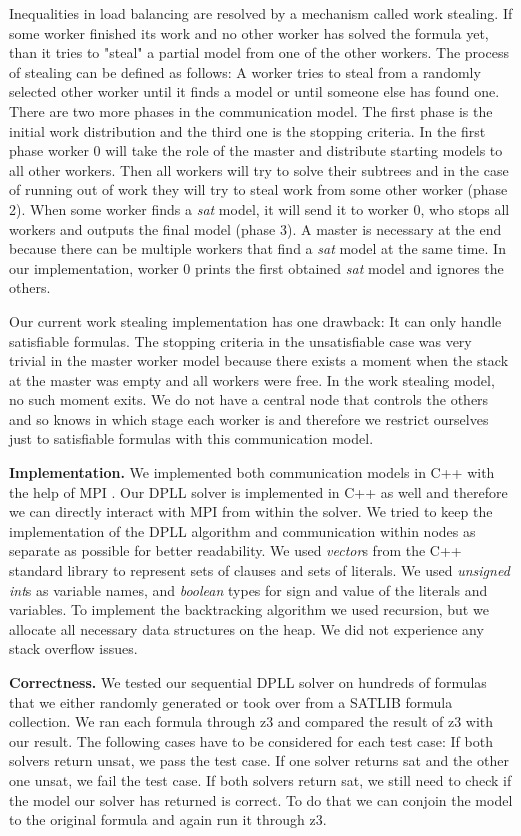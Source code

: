 \documentclass[letterpaper]{article}
\newcommand{\mypar}[1]{{\bf #1.}}
\begin{document}
Inequalities in load balancing are resolved by a mechanism called work stealing.
If some worker finished its work and no other worker has solved the formula yet, than it tries to "steal" a partial model from one of the other workers.
The process of stealing can be defined as follows:
A worker tries to steal from a randomly selected other worker until it finds a model or until someone else has found one.
There are two more phases in the communication model.
The first phase is the initial work distribution and the third one is the stopping criteria.
In the first phase worker 0 will take the role of the master and distribute starting models to all other workers.
Then all workers will try to solve their subtrees and in the case of running out of work they will try to steal work from some other worker (phase 2).
When some worker finds a \textit{sat} model, it will send it to worker 0, who stops all workers and outputs the final model (phase 3).
A master is necessary at the end because there can be multiple workers that find a \textit{sat} model at the same time.
In our implementation, worker 0 prints the first obtained \textit{sat} model and ignores the others.

Our current work stealing implementation has one drawback:
It can only handle satisfiable formulas.
The stopping criteria in the unsatisfiable case was very trivial in the master worker model because there exists a moment when the stack at the master was empty and all workers were free.
In the work stealing model, no such moment exits.
We do not have a central node that controls the others and so knows in which stage each worker is and therefore we restrict ourselves just to satisfiable formulas with this communication model.

\mypar{Implementation}
We implemented both communication models in C++ with the help of MPI \cite{mpi}.
Our DPLL solver is implemented in C++ as well and therefore we can directly interact with MPI from within the solver.
We tried to keep the implementation of the DPLL algorithm and communication within nodes as separate as possible for better readability.
We used \textit{vector}s from the C++ standard library to represent sets of clauses and sets of literals.
We used \textit{unsigned int}s as variable names, and \textit{boolean} types for sign and value of the literals and variables.
To implement the backtracking algorithm we used recursion, but we allocate all necessary data structures on the heap.
We did not experience any stack overflow issues.

\mypar{Correctness}
We tested our sequential DPLL solver on hundreds of formulas that we either randomly generated or took over from a SATLIB formula collection. \cite{cnf_website}
We ran each formula through z3 \cite{z3} and compared the result of z3 with our result.
The following cases have to be considered for each test case:
If both solvers return unsat, we pass the test case.
If one solver returns sat and the other one unsat, we fail the test case.
If both solvers return sat, we still need to check if the model our solver has returned is correct.
To do that we can conjoin the model to the original formula and again run it through z3.
\end{document}
